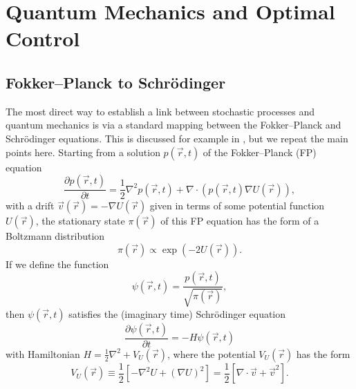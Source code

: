 \documentclass[12pt]{msml2020} %
\newcommand*{\br}{\vec{r}}
\begin{document}
\section{Quantum Mechanics and Optimal Control}\label{sec:oc}



\subsection{Fokker--Planck to Schr\"odinger}\label{sec:fp}

The most direct way to establish a link between stochastic processes and quantum mechanics is via a standard mapping between the Fokker--Planck and Schr\"odinger equations. This is discussed for example in \cite{Risken:1996aa,Pavliotis:2014aa}, but we repeat the main points here. Starting from a solution $ p({\vec{r}},t)$ of the Fokker--Planck (FP) equation
%
\begin{equation} \label{eq:fp}
  \frac{\partial p({\vec{r}},t)}{\partial t} = \frac{1}{2} \nabla^2 p({\vec{r}},t) + \nabla \cdot \left ( p({\vec{r}},t) \nabla U({\vec{r}}) \right ),
\end{equation}
%
with a drift $\vec{v}(\br) = - \nabla U({\vec{r}})$ given in terms of some potential function $U({\vec{r}})$, the stationary state $\pi({\vec{r}})$ of this FP equation has the form of a Boltzmann distribution%
%
\begin{equation}
  \pi({\vec{r}}) \propto \exp \left(-2 U({\vec{r}}) \right).
\end{equation}
%
If we define the function
%
\begin{equation}\label{eq:psi_def}
  \psi({\vec{r}},t) = \frac{p({\vec{r}},t)}{\sqrt{\pi({\vec{r}})}},
\end{equation}
%
then $\psi({\vec{r}},t)$ satisfies the (imaginary time) Schr\"odinger equation
%
\begin{equation}
  \frac{\partial \psi({\vec{r}},t)}{\partial t} = -H \psi({\vec{r}},t)
\end{equation}
%
with Hamiltonian $H=\frac{1}{2} \nabla^2+V_U(\vec{r})$,
%
%
where the potential $V_U(\vec{r})$ has the form
%
\begin{equation}\label{eq:FP-pot}
V_U(\vec{r})\equiv \frac{1}{2} \left[-\nabla^2 U + (\nabla U)^2\right]=\frac{1}{2}\left[\nabla\cdot \vec{v}+\vec{v}^2\right].
\end{equation}
\end{document}
